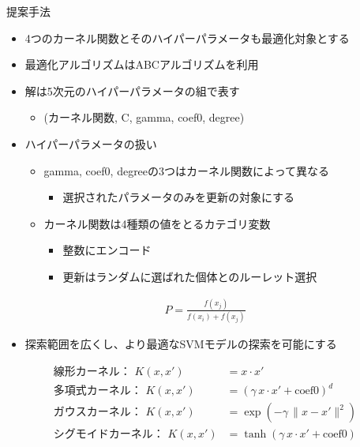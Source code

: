 \documentclass[12pt, cjk, dvipdfmx]{beamer}
\begin{document}
\begin{frame}
\begin{columns}[t]
\begin{column}{0.490\linewidth}
            \begin{mybox}{提案手法}
              \begin{itemize}
                \item 4つのカーネル関数とそのハイパーパラメータも最適化対象とする
                \item 最適化アルゴリズムはABCアルゴリズムを利用
                \item 解は5次元のハイパーパラメータの組で表す
                  \begin{itemize}
                    \item (カーネル関数, C, gamma, coef0, degree)                   
                  \end{itemize}
                \item ハイパーパラメータの扱い
                  \begin{itemize} 
                  \item gamma, coef0, degreeの3つはカーネル関数によって異なる
                  \begin{itemize}  
                    \item 選択されたパラメータのみを更新の対象にする
                  \end{itemize}    
                  \item カーネル関数は4種類の値をとるカテゴリ変数
                  \begin{itemize}
                    \item 整数にエンコード
                    \item 更新はランダムに選ばれた個体とのルーレット選択
                  \end{itemize}
                \end{itemize}
              \end{itemize}
              \begin{align*}
                P = \frac{f(x_j)}{f(x_i)+f(x_j)}
               \end{align*}
               \begin{itemize}
                \item 探索範囲を広くし、より最適なSVMモデルの探索を可能にする
              \end{itemize} 
              \begin{align*}
             \text{線形カーネル： }  K(x, x') &= x \cdot x'\\
             \text{多項式カーネル： }   K(x, x') &= (\gamma \, x \cdot x' + \text{coef0})^d\\
             \text{ガウスカーネル： }   K(x, x') &= \exp(-\gamma \, \|x - x'\|^2)\\
             \text{シグモイドカーネル： }  K(x, x') &= \tanh(\gamma \, x \cdot x' + \text{coef0})
               \end{align*}
            \end{mybox}
            

\end{column}
\end{columns}
\end{frame}
\end{document}
